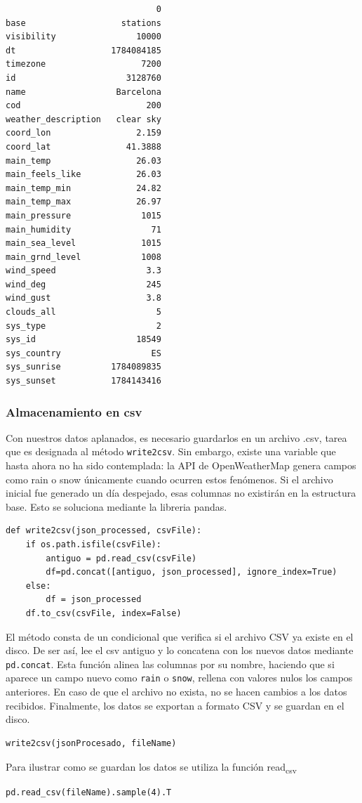 \documentclass[11pt]{article}
\begin{document}
\label{org07219c2}
\begin{verbatim}
                              0
base                   stations
visibility                10000
dt                   1784084185
timezone                   7200
id                      3128760
name                  Barcelona
cod                         200
weather_description   clear sky
coord_lon                 2.159
coord_lat               41.3888
main_temp                 26.03
main_feels_like           26.03
main_temp_min             24.82
main_temp_max             26.97
main_pressure              1015
main_humidity                71
main_sea_level             1015
main_grnd_level            1008
wind_speed                  3.3
wind_deg                    245
wind_gust                   3.8
clouds_all                    5
sys_type                      2
sys_id                    18549
sys_country                  ES
sys_sunrise          1784089835
sys_sunset           1784143416
\end{verbatim}
\subsubsection{Almacenamiento en csv}
\label{sec:orgea3bfa5}
Con nuestros datos aplanados, es necesario guardarlos en un archivo
.csv, tarea que es designada al método \texttt{write2csv}. Sin embargo,
existe una variable que hasta ahora no ha sido contemplada: la API de
OpenWeatherMap genera campos como rain o snow únicamente cuando
ocurren estos fenómenos. Si el archivo inicial fue generado un día despejado,
esas columnas no existirán en la estructura base. Esto se soluciona
mediante la libreria pandas.
\begin{verbatim}
def write2csv(json_processed, csvFile):
    if os.path.isfile(csvFile):
        antiguo = pd.read_csv(csvFile)
        df=pd.concat([antiguo, json_processed], ignore_index=True)
    else:
        df = json_processed
    df.to_csv(csvFile, index=False)
\end{verbatim}
El método consta de un condicional que verifica si el archivo CSV ya
existe en el disco. De ser así, lee el csv antiguo y lo
concatena con los nuevos datos mediante \texttt{pd.concat}. Esta función
alinea las columnas por su nombre, haciendo que si aparece un campo
nuevo como \texttt{rain} o \texttt{snow}, rellena con valores nulos los campos anteriores. En caso de que el
archivo no exista, no se hacen cambios a los datos recibidos. Finalmente,
los datos se exportan a formato CSV y se guardan en el disco.
\begin{verbatim}
write2csv(jsonProcesado, fileName)
\end{verbatim}
Para ilustrar como se guardan los datos se utiliza la función read\textsubscript{csv}
\begin{verbatim}
pd.read_csv(fileName).sample(4).T
\end{verbatim}
\end{document}
